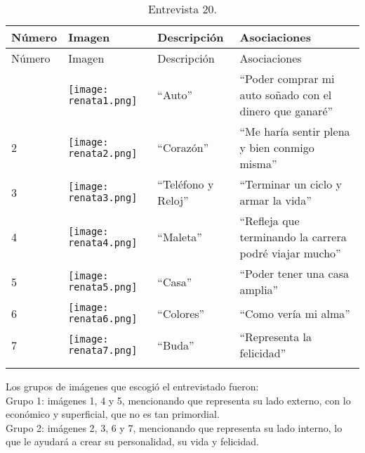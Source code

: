 \begin{longtable}{>{\centering\arraybackslash}m{1cm} >{\centering\arraybackslash}m{2cm} >{\arraybackslash}m{5cm}>{\arraybackslash}m{5cm}}
	
	\hline
	Número & Imagen & Descripción & Asociaciones \\
	\hline \hline
	\endfirsthead
	
	\hline
	Número & Imagen & Descripción & Asociaciones \\
	\hline \hline
	\endhead
		1 & \texttt{[image: renata1.png]} & ``Auto'' & ``Poder comprar mi auto soñado con el dinero que ganaré'' \\
		\hline
		
		2 & \texttt{[image: renata2.png]} & ``Corazón'' & ``Me haría sentir plena y bien conmigo misma'' \\
		\hline
		
		3 & \texttt{[image: renata3.png]} & ``Teléfono y Reloj'' & ``Terminar un ciclo y armar la vida'' \\
		\hline
		
		4 & \texttt{[image: renata4.png]} & ``Maleta'' & ``Refleja que terminando la carrera podré viajar mucho'' \\
		\hline
		
		5 & \texttt{[image: renata5.png]} & ``Casa'' & ``Poder tener una casa amplia'' \\
		\hline
		
		6 & \texttt{[image: renata6.png]} & ``Colores'' & ``Como vería mi alma'' \\
		\hline
		
		7 & \texttt{[image: renata7.png]} & ``Buda'' & ``Representa la felicidad'' \\
		\hline

	\caption{Entrevista 20.}
	\label{tabla:renata}
\end{longtable}

Los grupos de imágenes que escogió el entrevistado fueron:\\

Grupo 1: imágenes 1, 4 y 5, mencionando que representa su lado externo, con lo económico y superficial, que no es tan primordial. \\

Grupo 2: imágenes 2, 3, 6 y 7, mencionando que representa su lado interno, lo que le ayudará a crear su personalidad, su vida y felicidad.\\


